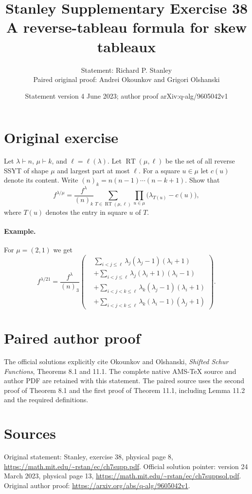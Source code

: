 \documentclass[11pt,a4paper]{article}
\title{Stanley Supplementary Exercise 38\\A reverse-tableau formula for skew tableaux}
\author{Statement: Richard P. Stanley\\Paired original proof: Andrei Okounkov and Grigori Olshanski}
\date{Statement version 4 June 2023; author proof arXiv:q-alg/9605042v1}
\begin{document}
\maketitle
\section*{Original exercise}
Let \(\lambda\vdash n\), \(\mu\vdash k\), and \(\ell=\ell(\lambda)\).
Let \(\operatorname{RT}(\mu,\ell)\) be the set of all reverse SSYT of shape \(\mu\)
and largest part at most \(\ell\). For a square \(u\in\mu\) let \(c(u)\)
denote its content. Write \((n)_k=n(n-1)\cdots(n-k+1)\). Show that
\[
 f^{\lambda/\mu}=\frac{f^\lambda}{(n)_k}
 \sum_{T\in\operatorname{RT}(\mu,\ell)}
 \prod_{u\in\mu}\bigl(\lambda_{T(u)}-c(u)\bigr),
\]
where \(T(u)\) denotes the entry in square \(u\) of \(T\).

\paragraph{Example.} For \(\mu=(2,1)\) we get
\[
 f^{\lambda/21}=\frac{f^\lambda}{(n)_3}
 \left(
 \begin{aligned}
 &\sum_{i<j\le\ell}\lambda_j(\lambda_j-1)(\lambda_i+1)\\
 &+\sum_{i<j\le\ell}\lambda_j(\lambda_i+1)(\lambda_i-1)\\
 &+\sum_{i<j<k\le\ell}\lambda_k(\lambda_j-1)(\lambda_i+1)\\
 &+\sum_{i<j<k\le\ell}\lambda_k(\lambda_i-1)(\lambda_j+1)
 \end{aligned}
 \right).
\]

\section*{Paired author proof}
The official solutions explicitly cite Okounkov and Olshanski,
\emph{Shifted Schur Functions}, Theorems 8.1 and 11.1.
The complete native AMS-TeX source and author PDF are retained with this statement.
The paired source uses the second proof of Theorem 8.1 and the first proof
of Theorem 11.1, including Lemma 11.2 and the required definitions.

\section*{Sources}
Original statement: Stanley, exercise 38, physical page 8,
\url{https://math.mit.edu/~rstan/ec/ch7supp.pdf}.
Official solution pointer: version 24 March 2023, physical page 13,
\url{https://math.mit.edu/~rstan/ec/ch7suppsol.pdf}.
Original author proof:
\url{https://arxiv.org/abs/q-alg/9605042v1}.
\end{document}
